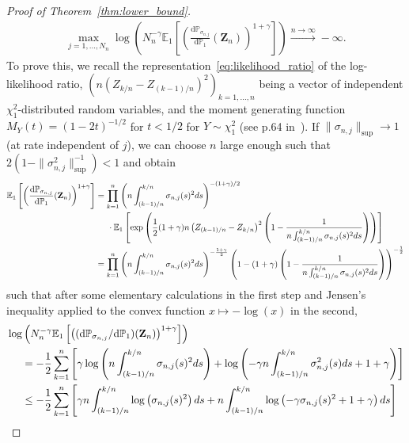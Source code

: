 \documentclass[10.5pt,letter]{article}
\numberwithin{equation}{section}
\theoremstyle{definition}
\newcommand{\E}{\mathbb{E}}
\renewcommand{\P}{\mathbb{P}}
\newcommand{\1}{\mathbbm{1}}
\begin{document}
\begin{proof}[Proof of Theorem~\ref{thm:lower_bound}]
\begin{align}
    \max_{j=1,\dots, N_n}\log\left( N_n^{-\gamma}\E_1 \left[\left(\frac{\textrm{d}\P_{\sigma_{n,j}}}{\textrm{d}\P_1}(\mathbf{Z}_n)\right)^{1+\gamma}\right] \right) \stackrel{n\to\infty}{\longrightarrow} -\infty.
\end{align}
To prove this, we recall the representation~\eqref{eq:likelihood_ratio} of the log-likelihood ratio, $(n(Z_{k/n}-Z_{(k-1)/n})^2)_{k=1,\dots,n}$ being a vector of independent $\chi_1^2$-distributed random variables, and the moment generating function $M_Y(t)=(1-2t)^{-1/2}$ for $t<1/2$ for $Y\sim\chi_1^2$ (see p.64 in~\cite{Davison}). If $\|\sigma_{n,j}\|_{\sup}\rightarrow 1$ (at rate independent of $j$), we can choose $n$ large enough such that $2(1-\|\sigma_{n,j}^2\|_{\sup}^{-1})<1$ and obtain
\begin{align*}
    \E_1 \left[\left(\frac{\textrm{d}\P_{\sigma_{n,j}}}{\textrm{d}\P_1}(\mathbf{Z}_n)\right)^{1+\gamma}\right] &= \prod_{k=1}^n \left( n\int_{(k-1)/n}^{k/n} \sigma_{n,j}(s)^2 ds\right)^{-(1+\gamma)/2}  \\
    &\hspace{0.5cm}\cdot\E_1\left[\exp\left( \frac12 (1+\gamma) n\left(Z_{(k-1)/n}-Z_{k/n}\right)^2 \left( 1- \frac{1}{n\int_{(k-1)/n}^{k/n} \sigma_{n,j}(s)^2 ds}\right)\right) \right] \\
    &= \prod_{k=1}^n \left( n\int_{(k-1)/n}^{k/n} \sigma_{n,j}(s)^2 ds\right)^{-\frac{1+\gamma}{2}} \left( 1-(1+\gamma)\left( 1- \frac{1}{n\int_{(k-1)/n}^{k/n} \sigma_{n,j}(s)^2 ds}\right)\right)^{-\frac12}
\end{align*}
such that after some elementary calculations in the first step and Jensen's inequality applied to the convex function $x\mapsto -\log(x)$ in the second,
\begin{align}\label{eq_proof:lower2}
\begin{split}
    &\log\left( N_n^{-\gamma}\E_1 \left[\left((\textrm{d}\P_{\sigma_{n,j}}/\textrm{d}\P_1)(\mathbf{Z}_n)\right)^{1+\gamma}\right] \right)\\
    &\hspace{0.5cm} = -\frac{1}{2}\sum_{k=1}^n \left[\gamma\log\left( n\int_{(k-1)/n}^{k/n} \sigma_{n,j}(s)^2ds\right) + \log\left(-\gamma n\int_{(k-1)/n}^{k/n}\sigma_{n,j}^2(s)ds + 1+\gamma\right) \right] \\
    &\hspace{0.5cm} \leq -\frac12\sum_{k=1}^n\left[ \gamma n\int_{(k-1)/n}^{k/n} \log\left(\sigma_{n,j}(s)^2\right) ds + n\int_{(k-1)/n}^{k/n} \log\left( -\gamma\sigma_{n,j}(s)^2+1+\gamma\right) ds \right] \\

\end{split}
\end{align}
\end{proof}
\end{document}
